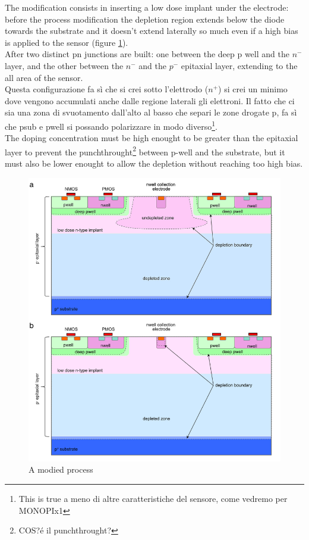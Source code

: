       The modification consists in inserting a low dose implant under the electrode: before the process modification the depletion region extends below the diode towards the substrate and it doesn't extend laterally so much even if a high bias is applied to the sensor (figure \ref{fig:modified_process}). \\
      After two distinct pn junctions are built: one between the deep p well and the $n^-$ layer, and the other between the $n^-$ and the $p^-$ epitaxial layer, extending to the all area of the sensor.\\
      Questa configurazione fa sì che si crei sotto l'elettrodo ($n^+$) si crei un minimo dove vengono 
      accumulati anche dalle regione laterali gli elettroni. 
      Il fatto che ci sia una zona di svuotamento dall'alto al basso che separi le zone drogate p, fa sì
      che psub e pwell si possando polarizzare in modo diverso\footnote{This is true a meno di altre 
      caratteristiche del sensore, come vedremo per MONOPIx1}.\\
      The doping concentration must be high enought to be greater than the epitaxial layer to prevent the punchthrought\footnote{COS?é il punchthrought?} between p-well and the substrate, but it must also be lower enought to allow the depletion without reaching too high bias.
      \begin{figure}
         \centering
         \includegraphics[width=.7\linewidth]{figures/Pixel_detectors/modified_process.png}
         \caption{A modied process}
         \label{fig:modified_process}
      \end{figure}


